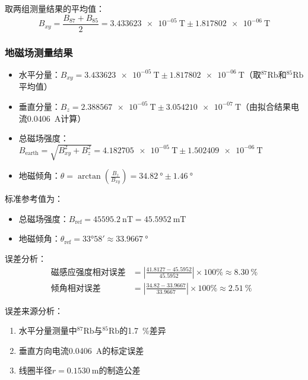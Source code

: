 取两组测量结果的平均值：
$$
B_{xy} = \frac{B_{87} + B_{85}}{2} = \SI{3.433623e-05}{\tesla} \pm \SI{1.817802e-06}{\tesla}
$$

\subsubsection{地磁场测量结果}

\begin{itemize}
    \item 水平分量：$B_{xy} = \SI{3.433623e-05}{\tesla} \pm \SI{1.817802e-06}{\tesla}$（取${}^{87}\text{Rb}$和${}^{85}\text{Rb}$平均值）
    \item 垂直分量：$B_z = \SI{2.388567e-05}{\tesla} \pm \SI{3.054210e-07}{\tesla}$（由拟合结果电流\SI{0.0406}{\ampere}计算）
    \item 总磁场强度：$B_{\text{earth}} = \sqrt{B_{xy}^2 + B_z^2} = \SI{4.182705e-05}{\tesla} \pm \SI{1.502409e-06}{\tesla}$
    \item 地磁倾角：$\theta = \arctan\left(\frac{B_z}{B_{xy}}\right) = \SI{34.82}{\degree} \pm \SI{1.46}{\degree}$
\end{itemize}

标准参考值为：
\begin{itemize}
    \item 总磁场强度：$B_{\text{ref}} = \SI{45595.2}{\nano\tesla} = \SI{45.5952}{\milli\tesla}$
    \item 地磁倾角：$\theta_{\text{ref}} = \ang{33;58} \approx \SI{33.9667}{\degree}$
\end{itemize}

误差分析：
\begin{align*}
    \text{磁感应强度相对误差} &= \left|\frac{41.8127 - 45.5952}{45.5952}\right| \times 100\% \approx \SI{8.30}{\percent} \\
    \text{倾角相对误差} &= \left|\frac{34.82 - 33.9667}{33.9667}\right| \times 100\% \approx \SI{2.51}{\percent}
\end{align*}

误差来源分析：
\begin{enumerate}
    \item 水平分量测量中${}^{87}\text{Rb}$与${}^{85}\text{Rb}$的\SI{1.7}{\percent}差异
    \item 垂直方向电流\SI{0.0406}{\ampere}的标定误差
    \item 线圈半径$r=\SI{0.1530}{\meter}$的制造公差
\end{enumerate}



